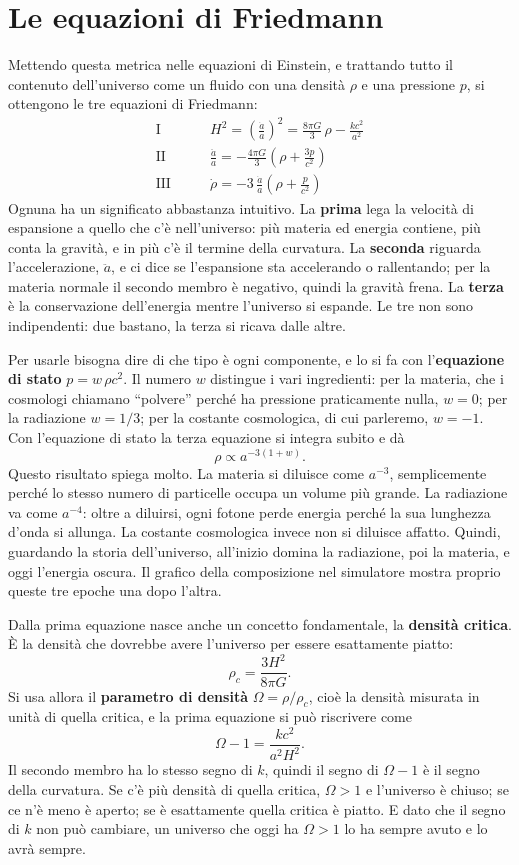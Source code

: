 \documentclass[12pt,a4paper]{article}
\begin{document}
\section{Le equazioni di Friedmann}
Mettendo questa metrica nelle equazioni di Einstein, e trattando tutto il contenuto dell'universo come un fluido con una densità $\rho$ e una pressione $p$, si ottengono le tre equazioni di Friedmann:
\begin{align*}
\text{I} \qquad & H^2 = \left(\frac{\dot a}{a}\right)^2 = \frac{8\pi G}{3}\,\rho - \frac{k c^2}{a^2} \\[2pt]
\text{II} \qquad & \frac{\ddot a}{a} = -\frac{4\pi G}{3}\left(\rho + \frac{3p}{c^2}\right) \\[2pt]
\text{III} \qquad & \dot\rho = -3\,\frac{\dot a}{a}\left(\rho + \frac{p}{c^2}\right)
\end{align*}
Ognuna ha un significato abbastanza intuitivo. La \textbf{prima} lega la velocità di espansione a quello che c'è nell'universo: più materia ed energia contiene, più conta la gravità, e in più c'è il termine della curvatura. La \textbf{seconda} riguarda l'accelerazione, $\ddot a$, e ci dice se l'espansione sta accelerando o rallentando; per la materia normale il secondo membro è negativo, quindi la gravità frena. La \textbf{terza} è la conservazione dell'energia mentre l'universo si espande. Le tre non sono indipendenti: due bastano, la terza si ricava dalle altre.

Per usarle bisogna dire di che tipo è ogni componente, e lo si fa con l'\textbf{equazione di stato} $p = w\,\rho c^2$. Il numero $w$ distingue i vari ingredienti: per la materia, che i cosmologi chiamano ``polvere'' perché ha pressione praticamente nulla, $w = 0$; per la radiazione $w = 1/3$; per la costante cosmologica, di cui parleremo, $w = -1$. Con l'equazione di stato la terza equazione si integra subito e dà
\[ \rho \propto a^{-3(1+w)} . \]
Questo risultato spiega molto. La materia si diluisce come $a^{-3}$, semplicemente perché lo stesso numero di particelle occupa un volume più grande. La radiazione va come $a^{-4}$: oltre a diluirsi, ogni fotone perde energia perché la sua lunghezza d'onda si allunga. La costante cosmologica invece non si diluisce affatto. Quindi, guardando la storia dell'universo, all'inizio domina la radiazione, poi la materia, e oggi l'energia oscura. Il grafico della composizione nel simulatore mostra proprio queste tre epoche una dopo l'altra.

Dalla prima equazione nasce anche un concetto fondamentale, la \textbf{densità critica}. È la densità che dovrebbe avere l'universo per essere esattamente piatto:
\[ \rho_c = \frac{3H^2}{8\pi G} . \]
Si usa allora il \textbf{parametro di densità} $\Omega = \rho / \rho_c$, cioè la densità misurata in unità di quella critica, e la prima equazione si può riscrivere come
\[ \Omega - 1 = \frac{k c^2}{a^2 H^2} . \]
Il secondo membro ha lo stesso segno di $k$, quindi il segno di $\Omega - 1$ è il segno della curvatura. Se c'è più densità di quella critica, $\Omega > 1$ e l'universo è chiuso; se ce n'è meno è aperto; se è esattamente quella critica è piatto. E dato che il segno di $k$ non può cambiare, un universo che oggi ha $\Omega > 1$ lo ha sempre avuto e lo avrà sempre.
\end{document}
